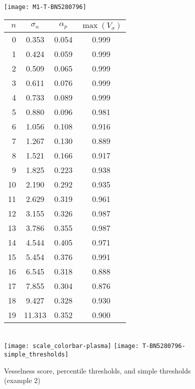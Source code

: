 \begin{figure}
  \begin{minipage}[tp]{0.5\textwidth}
    \texttt{[image: M1-T-BN5280796]}
  \end{minipage}
  \begin{minipage}[tp]{0.5\textwidth}
    \begin{tabular}{r|c|c|c}
      $n$  & $\sigma_n$  &  $\alpha_p$  &  $\max(V_\sigma)$ \\
      \hline
      0  &  0.353 &  0.054 &  0.999 \\
      1  &  0.424 &  0.059 &  0.999 \\
      2  &  0.509 &  0.065 &  0.999 \\
      3  &  0.611 &  0.076 &  0.999 \\
      4  &  0.733 &  0.089 &  0.999 \\
      5  &  0.880 &  0.096 &  0.981 \\
      6  &  1.056 &  0.108 &  0.916 \\
      7  &  1.267 &  0.130 &  0.889 \\
      8  &  1.521 &  0.166 &  0.917 \\
      9  &  1.825 &  0.223 &  0.938 \\
      10 &  2.190 &  0.292 &  0.935 \\
      11 &  2.629 &  0.319 &  0.961 \\
      12 &  3.155 &  0.326 &  0.987 \\
      13 &  3.786 &  0.355 &  0.987 \\
      14 &  4.544 &  0.405 &  0.971 \\
      15 &  5.454 &  0.376 &  0.991 \\
      16 &  6.545 &  0.318 &  0.888 \\
      17 &  7.855 &  0.304 &  0.876 \\
      18 &  9.427 &  0.328 &  0.930 \\
      19 & 11.313 &  0.352 &  0.900 \\
    \end{tabular} \\           
    \texttt{[image: scale\_colorbar-plasma]} \;
    \texttt{[image: T-BN5280796-simple\_thresholds]}
  \end{minipage}
  \caption{Vesselness score, percentile thresholds, and simple thresholds (example 2)}
  \label{fig:detailed_frangi_with_table_ex2}
\end{figure}


